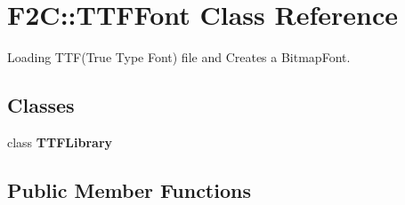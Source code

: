 \hypertarget{class_f2_c_1_1_t_t_f_font}{
\section{F2C::TTFFont Class Reference}
\label{class_f2_c_1_1_t_t_f_font}
}


Loading TTF(True Type Font) file and Creates a BitmapFont.  
\subsection*{Classes}
\begin{DoxyCompactItemize}
\item 
class {\bfseries TTFLibrary}
\end{DoxyCompactItemize}
\subsection*{Public Member Functions}
